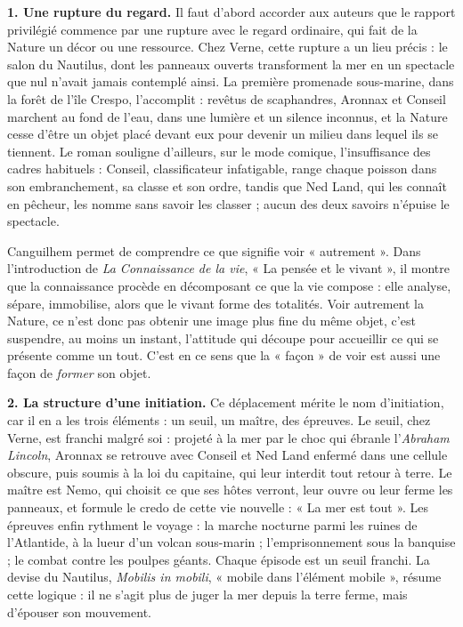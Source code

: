 \documentclass[11pt,a4paper]{article}
\begin{document}
\textbf{1. Une rupture du regard.} Il faut d'abord accorder aux auteurs que le rapport privilégié commence par une rupture avec le regard ordinaire, qui fait de la Nature un décor ou une ressource. Chez Verne, cette rupture a un lieu précis : le salon du Nautilus, dont les panneaux ouverts transforment la mer en un spectacle que nul n'avait jamais contemplé ainsi. La première promenade sous-marine, dans la forêt de l'île Crespo, l'accomplit : revêtus de scaphandres, Aronnax et Conseil marchent au fond de l'eau, dans une lumière et un silence inconnus, et la Nature cesse d'être un objet placé devant eux pour devenir un milieu dans lequel ils se tiennent. Le roman souligne d'ailleurs, sur le mode comique, l'insuffisance des cadres habituels : Conseil, classificateur infatigable, range chaque poisson dans son embranchement, sa classe et son ordre, tandis que Ned Land, qui les connaît en pêcheur, les nomme sans savoir les classer ; aucun des deux savoirs n'épuise le spectacle.

Canguilhem permet de comprendre ce que signifie voir « autrement ». Dans l'introduction de \emph{La Connaissance de la vie}, « La pensée et le vivant », il montre que la connaissance procède en décomposant ce que la vie compose : elle analyse, sépare, immobilise, alors que le vivant forme des totalités. Voir autrement la Nature, ce n'est donc pas obtenir une image plus fine du même objet, c'est suspendre, au moins un instant, l'attitude qui découpe pour accueillir ce qui se présente comme un tout. C'est en ce sens que la « façon » de voir est aussi une façon de \emph{former} son objet.

\textbf{2. La structure d'une initiation.} Ce déplacement mérite le nom d'initiation, car il en a les trois éléments : un seuil, un maître, des épreuves. Le seuil, chez Verne, est franchi malgré soi : projeté à la mer par le choc qui ébranle l'\emph{Abraham Lincoln}, Aronnax se retrouve avec Conseil et Ned Land enfermé dans une cellule obscure, puis soumis à la loi du capitaine, qui leur interdit tout retour à terre. Le maître est Nemo, qui choisit ce que ses hôtes verront, leur ouvre ou leur ferme les panneaux, et formule le credo de cette vie nouvelle : « La mer est tout ». Les épreuves enfin rythment le voyage : la marche nocturne parmi les ruines de l'Atlantide, à la lueur d'un volcan sous-marin ; l'emprisonnement sous la banquise ; le combat contre les poulpes géants. Chaque épisode est un seuil franchi. La devise du Nautilus, \emph{Mobilis in mobili}, « mobile dans l'élément mobile », résume cette logique : il ne s'agit plus de juger la mer depuis la terre ferme, mais d'épouser son mouvement.
\end{document}
